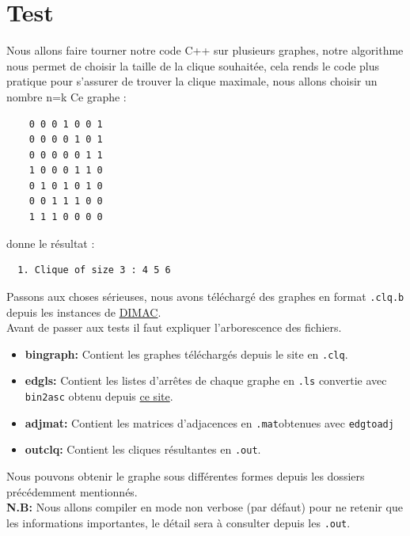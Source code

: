 \documentclass{article}
\begin{document}
\section{Test}
Nous allons faire tourner notre code C++ sur plusieurs graphes, notre algorithme
nous permet de choisir la taille de la clique souhaitée, cela rends le code plus pratique
pour s'assurer de trouver la clique maximale, nous allons choisir un nombre n=k
Ce graphe :
\begin{center}
  \begin{verbatim}
    0 0 0 1 0 0 1
    0 0 0 0 1 0 1
    0 0 0 0 0 1 1
    1 0 0 0 1 1 0
    0 1 0 1 0 1 0
    0 0 1 1 1 0 0
    1 1 1 0 0 0 0
  \end{verbatim}
\end{center}
donne le résultat :
\begin{center}
  \begin{verbatim}
  1. Clique of size 3 : 4 5 6
  \end{verbatim}
\end{center}
Passons aux choses sérieuses, nous avons téléchargé des graphes en format \texttt{.clq.b} depuis les
instances de \href{https://cse.unl.edu/~tnguyen/npbenchmarks/clique.html}{DIMAC}. \\
Avant de passer aux tests il faut expliquer l'arborescence des fichiers.
\begin{itemize}
  \item \textbf{bingraph:} Contient les graphes téléchargés depuis le site en \texttt{.clq}.
  \item \textbf{edgls:} Contient les listes d'arrêtes de chaque graphe en \texttt{.ls} convertie avec \texttt{bin2asc}
    obtenu depuis \href{https://cse.unl.edu/~tnguyen/npbenchmarks/instances/converter.tar.gz}{ce site}.
  \item \textbf{adjmat:} Contient les matrices d'adjacences en \texttt{.mat}obtenues avec \texttt{edgtoadj}
  \item \textbf{outclq:} Contient les cliques résultantes en \texttt{.out}.
\end{itemize}
Nous pouvons obtenir le graphe sous différentes formes depuis les dossiers précédemment mentionnés.\\
\textbf{N.B:} Nous allons compiler en mode non verbose (par défaut) pour ne retenir que les informations
importantes, le détail sera à consulter depuis les \texttt{.out}.
\end{document}
